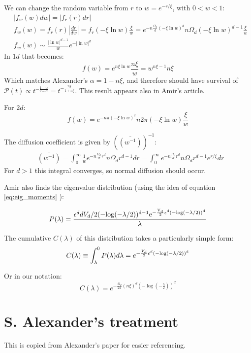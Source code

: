 \documentclass[onecolumn,fleqn]{revtex4}
\newenvironment{fminipage}%
  {\begin{Sbox}\begin{minipage}}%
  {\end{minipage}\end{Sbox}\fbox{\TheSbox}}
\begin{document}

We can change the random variable from $r$ to $w= e^{-r/ \xi}$, with $0<w<1$:
\begin{align*}
    &|f_w(w)dw| = |f_r(r)dr| \\
    &f_w(w) = f_r(r)\left|\frac{dr}{dw}\right| = f_r(-\xi \ln w)\frac{\xi}{w} = e^{-n \frac{\Omega_d}{d} (-\xi\ln w)^d} n\Omega_d (-\xi\ln w)^{d-1}\frac{\xi}{w} \\
    &f_w(w) \sim \frac{|\ln w|^{d-1}}{w} e^{-|\ln w|^d}
\end{align*}
In $1d$ that becomes:
\[ f(w)= e^{n \xi\ln w} \frac{n\xi}{w} = w^{n\xi-1}n\xi\]
Which matches Alexander's $\alpha = 1-n\xi$, and therefore should have survival of $\mathcal{P}(t)\propto t^{-\frac{1-\alpha}{2-\alpha}}= t^{-\frac{n\xi}{1+n\xi}}$. This result appears also in Amir's article.



For $2d$:
\[ f(w) = e^{-n \pi (-\xi\ln w)^2} n 2\pi  (-\xi\ln w)\frac{\xi}{w}\]

The diffusion coefficient is given by $\left(\overline{(w^{-1})}\right)^{-1}$:
\begin{align*}
    & \overline{(w^{-1})} = \int_0^\infty \frac{1}{w} e^{-n \frac{\Omega_d}{d} r^d} n\Omega_d r^{d-1} dr = \int_0^\infty e^{-n \frac{\Omega_d}{d} r^d} n\Omega_d r^{d-1}e^{r/\xi} dr 
\end{align*}
For $d>1$ this integral converges, so normal diffusion should occur.

Amir also finds the eigenvalue distribution (using the idea of equation \eqref{eq:eig_moments} ):

\begin{fminipage}{\textwidth}
\[ P(\lambda)=  \frac{\epsilon^d d V_d /2
(-\rm{log}(-\lambda/2))^{d-1} e^{-\frac{V_d}{2} \epsilon^d
(-\rm{log}(-\lambda/2))^d}}{\lambda} \]


The cumulative $C(\lambda)$ of this distribution takes a
particularly simple form: 
\[ C(\lambda)\equiv \int_\lambda^0
P(\lambda)d\lambda= e^{-\frac{V_d}{2} \epsilon^d
(-\rm{log}(-\lambda/2))^d} \]
\end{fminipage}
Or in our notation:
\[ C(\lambda)= e^{-\frac{\Omega_d}{2d} (n\xi)^d \left( -\log(-\frac{\lambda}{2})\right)^d} \]
\section{S. Alexander's treatment}
This is copied from Alexander's paper for easier referencing. 
\end{document}
